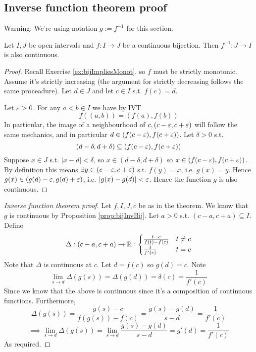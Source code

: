 \subsection{Inverse function theorem proof}
Warning: We're using notation $g:=f^{-1}$ for this section.
\begin{proposition}
  Let $I,J$ be open intervals and $f:I\to J$ be a continuous bijection. Then $f^{-1}:J\to
  I$ is also continuous.
  \label{prop:bijInvBij}
\end{proposition}
\begin{proof}
  Recall Exercise \ref{ex:bijImpliesMonot}, so $f$ must be strictly monotonic. Assume it's
  strictly increasing (the argument for strictly decreasing follows the same proceadure).
  Let $d\in J$ and let $c\in I$ s.t. $f(c)=d$.

  Let $\varepsilon>0$. For any $a<b\in I$ we have by IVT
  \[f((a,b))= (f(a),f(b))\]
  In particular, the image of a neighbourhood of $c, (c-\varepsilon,c+\varepsilon)$ will follow the same
  mechanics, and in particular $d\in (f(c-\varepsilon), f(c+\varepsilon))$. Let $\delta>0$ s.t. 
  \[(d-\delta, d+\delta) \subseteq (f(c-\varepsilon), f(c+\varepsilon))\]
  Suppose $x\in J$ s.t. $|x-d|<\delta$, so $x\in (d-\delta,d+\delta)$ so $x\in (f(c-\varepsilon),
  f(c+\varepsilon))$. By definition this means $\exists y\in (c-\varepsilon, c+\varepsilon)$ s.t. $f(y)=x$,
  i.e. $g(x)=y$. Hence $g(x)\in (g(d)-\varepsilon, g(d)+\varepsilon)$, i.e. $|g(x)-g(d)|<\varepsilon$.
  Hence the function $g$ is also continuous.
\end{proof}

\begin{proof}[Inverse function theorem proof]
  Let $f,I,J,c$ be as in the theorem. We know that $g$ is continuous by Proposition
  \ref{prop:bijInvBij}. Let $a>0$ s.t. $(c-a,c+a)\subseteq I$. Define
  \[\Delta:(c-a,c+a)\to\mathbb R:
    \begin{cases}
      \frac{t-c}{f(t)-f(c)} & t\neq c \\
      \frac{1}{f'(c)} & t=c
    \end{cases}
  \]
  Note that $\Delta$ is continuous at $c$. Let $d=f(c)$ so $g(d)=c$. Note 
  \[\lim_{s\to d} \Delta(g(s)) = \Delta(g(d))= \delta(c) = \frac{1}{f'(c)}\]
  Since we know that the above is continuous since it's a composition of continuous
  functions. Furthermore,
  \[\Delta(g(s))= \frac{g(s)-c}{f(g(s))-f(c)}= \frac{g(s)-g(d)}{s-d}
  =\frac{1}{f'(c)}\]
  \[\implies \lim_{s\to d} \Delta(g(s))= \lim_{s\to d}\frac{g(s)-g(d)}{s-d} = g'(d) =
  \frac{1}{f'(c)}\]
  As required.
\end{proof}

